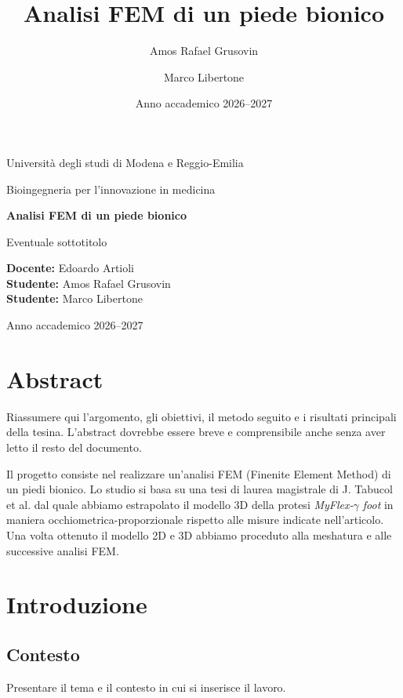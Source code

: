 \documentclass[12pt,a4paper,oneside]{report}
\title{Analisi FEM di un piede bionico}
\author{Amos Rafael Grusovin}
\author{Marco Libertone}
\date{Anno accademico 2026--2027}
\begin{document}
\begin{titlepage}
    \centering
    {\Large Università degli studi di Modena e Reggio-Emilia\par}
    \vspace{1.5cm}
    {\large Bioingegneria per l'innovazione in medicina\par}
    \vspace{2.5cm}
    {\Huge\bfseries Analisi FEM di un piede bionico\par}
    \vspace{0.5cm}
    {\Large Eventuale sottotitolo\par}
    \vfill
    \begin{flushleft}
        \textbf{Docente:} Edoardo Artioli\\[0.3cm]
        \textbf{Studente:} Amos Rafael Grusovin\\
        \textbf{Studente:} Marco Libertone
    \end{flushleft}
    \vfill
    {\large Anno accademico 2026--2027\par}
\end{titlepage}


\chapter*{Abstract}
Riassumere qui l'argomento, gli obiettivi, il metodo seguito e i risultati
principali della tesina. L'abstract dovrebbe essere breve e comprensibile
anche senza aver letto il resto del documento.

Il progetto consiste nel realizzare un'analisi FEM (Finenite Element Method) di un piedi bionico.
Lo studio si basa su una tesi di laurea magistrale di J. Tabucol et al. dal quale 
abbiamo estrapolato il modello 3D della protesi \textit{MyFlex-$\gamma$ foot} in maniera occhiometrica-proporzionale
rispetto alle misure indicate nell'articolo. Una volta ottenuto il modello 2D e 3D 
abbiamo proceduto alla meshatura e alle successive analisi FEM.


\tableofcontents
\clearpage
\renewcommand{\thepage}{\arabic{page}}

\chapter{Introduzione}
\section{Contesto}
Presentare il tema e il contesto in cui si inserisce il lavoro.
\end{document}
